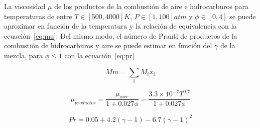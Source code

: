 La viscosidad $\mu$ de los productos de la combustión de aire e hidrocarburos
para temperaturas de entre $T\in [500, 4000]K$, $P\in[1, 100]atm$ y
$\phi \in [0,4]$ se puede aproximar en función de la temperatura y la relación
de equivalencia con la ecuación~\ref{eq:mu}.
%
Del mismo modo, el número de Prantl de productos de la combustión de
hidrocarburos y aire se puede estimar en función del $\gamma$ de la mezcla, para
$\phi\leq 1$ con la  ecuación~\ref{eq:pr}

\begin{equation}\label{eq:mw}
  Mm = \sum_{i} M_{i}x_{i}
\end{equation}

\begin{equation}\label{eq:mu}
  \mu_{productos} = \frac{\mu_{aire}} {1 + 0.027 \phi} = \frac{3.3\times 10^{-7} T^{0.7}} {1 + 0.027 \phi}
\end{equation}

\begin{equation}\label{eq:pr}
    Pr = 0.05 + 4.2 (\gamma - 1) - 6.7 {(\gamma - 1)}^{2}
\end{equation}
